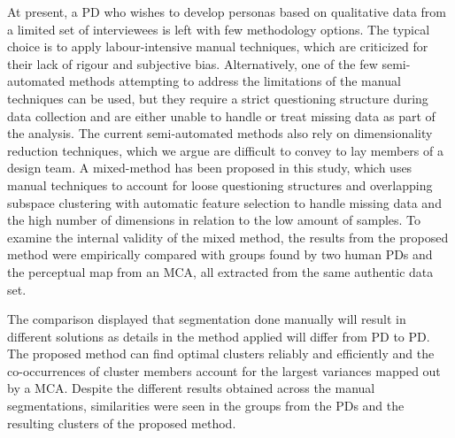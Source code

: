 At present, a PD who wishes to develop personas based on qualitative data from a limited set of interviewees is left with few methodology options. The typical choice is to apply labour-intensive manual techniques, which are criticized for their lack of rigour and subjective bias. Alternatively, one of the few semi-automated methods attempting to address the limitations of the manual techniques can be used, but they require a strict questioning structure during data collection and are either unable to handle or treat missing data as part of the analysis. The current semi-automated methods also rely on dimensionality reduction techniques, which we argue are difficult to convey to lay members of a design team. A mixed-method has been proposed in this study, which uses manual techniques to account for loose questioning structures and overlapping subspace clustering with automatic feature selection to handle missing data and the high number of dimensions in relation to the low amount of samples. To examine the internal validity of the mixed method, the results from the proposed method were empirically compared with groups found by two human PDs and the perceptual map from an MCA, all extracted from the same authentic data set.

The comparison displayed that segmentation done manually will result in different solutions as details in the method applied will differ from PD to PD. The proposed method can find optimal clusters reliably and efficiently and the co-occurrences of cluster members account for the largest variances mapped out by a MCA. Despite the different results obtained across the manual segmentations, similarities were seen in the groups from the PDs and the resulting clusters of the proposed method.



